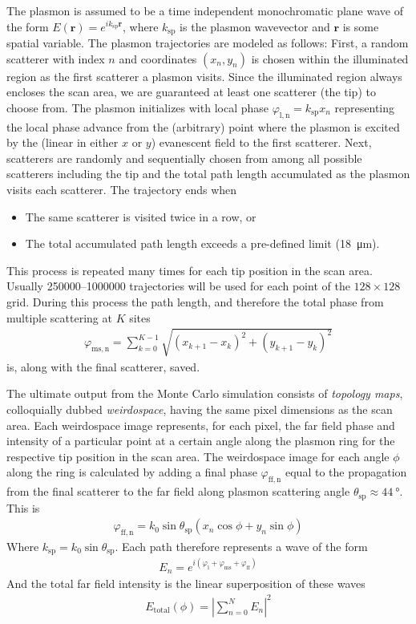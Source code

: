 The plasmon is assumed to be a time independent monochromatic plane wave
of the form $E(\mathbf{r})=e^{ik_\mathrm{sp}\mathbf{r}}$, where
$k_\mathrm{sp}$ is the plasmon wavevector and $\mathbf{r}$ is some
spatial variable.  The plasmon trajectories are modeled as follows:
First, a random scatterer with index $n$ and coordinates $(x_n,y_n)$ is
chosen within the illuminated region as the first scatterer a plasmon
visits.  Since the illuminated region always encloses the scan area, we are
guaranteed at least one scatterer (the tip) to choose from.  The plasmon
initializes with local phase $\varphi_\mathrm{l,n}=k_\mathrm{sp}x_n$
representing the local phase advance from the (arbitrary) point where the
plasmon is excited by the (linear in either $x$ or $y$) evanescent field to
the first scatterer.  Next, scatterers are randomly and sequentially chosen
from among all possible scatterers including the tip and the total path
length accumulated as the plasmon visits each scatterer.  The trajectory
ends when
\begin{itemize}
	\item The same scatterer is visited twice in a row, or
	\item The total accumulated path length exceeds a pre-defined limit
	      (\SI{18}{\micro\meter}).
\end{itemize}
This process is repeated many times for each tip position in the scan area.
Usually \numrange{250000}{1000000} trajectories will be used for each point
of the $128\times128$ grid.  During this process the path length, and
therefore the total phase from multiple scattering at $K$ sites
\begin{align}
	\varphi_\mathrm{ms,n}=\sum_{k=0}^{K-1} \sqrt{(x_{k+1}-x_k)^2+(y_{k+1}-y_k)^2}
\end{align}
is, along with the final scatterer, saved.

The ultimate output from the Monte Carlo simulation consists of {\it
		topology maps}, colloquially dubbed {\it weirdospace}, having the same pixel
dimensions as the scan area.  Each weirdospace image represents, for each
pixel, the far field phase and intensity of a particular point at a certain
angle along the plasmon ring for the respective tip position in the scan
area.  The weirdospace image for each angle $\phi$ along the ring is
calculated by adding a final phase $\varphi_\mathrm{ff,n}$ equal to the
propagation from the final scatterer to the far field along plasmon
scattering angle $\theta_\mathrm{sp}\approx \SI{44}{\degree}$.  This is
\begin{align}
	\varphi_\mathrm{ff,n} = k_0 \sin
	\theta_\mathrm{sp}\left(x_n\cos\phi+y_n\sin\phi\right)
\end{align}
Where $k_\mathrm{sp}=k_0\sin \theta_\mathrm{sp}$.  Each path therefore
represents a wave of the form
\begin{align}
	E_n=e^{i(\varphi_\mathrm{l}+\varphi_\mathrm{ms}+\varphi_\mathrm{ff})}
\end{align}
And the total far field intensity is the linear superposition of these
waves
\begin{align}
	E_\mathrm{total}(\phi) =
	\left|\sum_{n=0}^{N} E_n\right|^2
\end{align}

